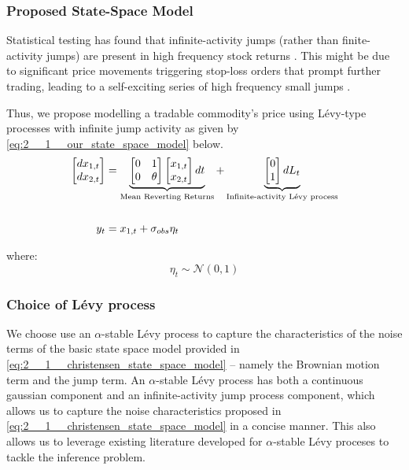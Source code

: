 \documentclass[../main.tex]{subfiles}
\begin{document}
\subsubsection{Proposed State-Space Model}

Statistical testing has found that infinite-activity jumps (rather than finite-activity jumps) are present in high frequency stock returns \cite{ait2011testing}. This might be due to significant price movements triggering stop-loss orders that prompt further trading, leading to a self-exciting series of high frequency small jumps \cite{osler2005stop}.

Thus, we propose modelling a tradable commodity's price using Lévy-type processes with infinite jump activity as given by \autoref{eq:2__1__our_state_space_model} below.
\begin{align}
    \begin{bmatrix}
    dx_{1,t} \\ dx_{2,t}
    \end{bmatrix} &= 
    \underbrace{
        \begin{bmatrix}
        0 & 1 \\ 0 & \theta
        \end{bmatrix}
        \begin{bmatrix}
        x_{1,t} \\ x_{2,t}
        \end{bmatrix} dt
    }_{\text{Mean Reverting Returns}} 
    + 
    \underbrace{
        \begin{bmatrix}
        0 \\ 1
        \end{bmatrix} dL_t
    }_{\text{Infinite-activity Lévy process}} \\ \notag \\
	y_t &= x_{1,t} + \sigma_{obs} \eta_t
    \label{eq:2__1__our_state_space_model}
\end{align}

where: 
$$ \eta_t \sim \mathcal{N}(0,1) $$


\subsubsection{Choice of Lévy process}

We choose use an $\alpha$-stable Lévy process to capture the characteristics of the noise terms of the basic state space model provided in \autoref{eq:2__1__christensen_state_space_model} -- namely the Brownian motion term and the jump term. An $\alpha$-stable Lévy process has both a continuous gaussian component and an infinite-activity jump process component, which allows us to capture the noise characteristics proposed in \autoref{eq:2__1__christensen_state_space_model} in a concise manner. This also allows us to leverage existing literature developed for $\alpha$-stable Lévy proceses to tackle the inference problem. 
\end{document}
